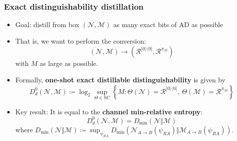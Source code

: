 \documentclass[usenames,dvipsnames,handout]{beamer}
\begin{document}
\begin{frame}
\frametitle{Exact distinguishability distillation}

\begin{itemize}

\pause
\item Goal: distill from  box $(\mathcal{N},\mathcal{M})$ as many exact bits of AD as possible

\pause
\item That is, we want to perform the conversion:
$$
(\mathcal{N},\mathcal{M}) \rightarrow (\mathcal{R}^{|0\rangle\!\langle 0 |}, \mathcal{R}^{\pi_M})
$$
with $M$ as large as possible.

\pause
\item Formally, {\color{MidnightBlue}\textbf{one-shot exact distillable distinguishability}}  is given by
$$
D_{d}^{0}(\mathcal{N},\mathcal{M})\coloneqq 
\log_{2}\sup_{\Theta\in\text{SC}}\left\{  M:
\Theta(\mathcal{N}
)=\mathcal{R}^{|0\rangle\!\langle 0 |},\ \Theta(\mathcal{M})=\mathcal{R}^{\pi_M}\right\}  
$$

\pause
\item Key result: It is equal to the {\color{MidnightBlue}\textbf{channel min-relative entropy}}:
$$
D_{d}^{0}(\mathcal{N},\mathcal{M}) = D_{\min}(\mathcal{N}  \Vert\mathcal{M})
$$
where $D_{\min}(\mathcal{N}  \Vert\mathcal{M}) \coloneqq  \sup_{\psi_{RA}} D_{\min}(\mathcal{N}_{A \to B} (\psi_{RA}) \Vert \mathcal{M}_{A\to B}(\psi_{RA}))$.

\end{itemize}

\end{frame}
\end{document}
